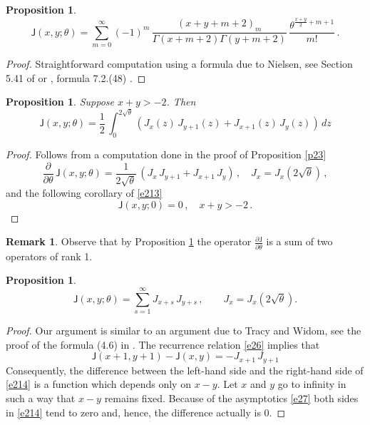 \documentclass[12pt]{amsart}
\newcommand{\Ga}{\Gamma}
\newcommand{\J}{\mathsf{J}}
\newcommand{\ix}{\theta}
\theoremstyle{plain}
\newtheorem{proposition}[lemma]{Proposition}
\theoremstyle{definition}
\newtheorem{remark}[lemma]{Remark}
\numberwithin{equation}{section}
\begin{document}
\begin{proposition}\label{p27} 
%
\begin{equation}\label{e213}
\J(x,y;\ix)=\sum_{m=0}^\infty(-1)^m\,
\frac{(x+y+m+2)_m}{\Ga(x+m+2)\Ga(y+m+2)}\,
\frac{\ix^{\frac{x+y}2+m+1}}{m!}\,.
\end{equation}
%
\end{proposition}

\begin{proof} Straightforward computation using a formula due
to Nielsen, see Section 5.41 of \cite{W} or 
\cite{HTF}, formula 7.2.(48) . \end{proof}


\begin{proposition}\label{p28} Suppose $x+y>-2$. Then 
%
\begin{equation*}
\J(x,y;\ix)=\frac12\, \int_0^{2\sqrt\ix} (J_x(z)\, J_{y+1}(z) + J_{x+1}(z)\, J_{y}(z))\, dz
\end{equation*}
%
\end{proposition}
\begin{proof} Follows from a computation done in the proof of Proposition \ref{p23}
%
\begin{equation*}
\frac{\partial}{\partial\ix} \, \J(x,y;\ix) = \frac{1}{2\sqrt{\ix}} \,
(J_x \, J_{y+1} + J_{x+1}\, J_{y}) \,,
\quad J_x=J_x(2\sqrt{\ix})\,, 
\end{equation*}
%
and the following corollary of \eqref{e213}
$$
\J(x,y;0)=0\,, \quad x+y>-2\,.
$$
\end{proof}

\begin{remark} 
Observe that  by Proposition \ref{p28} the operator $\frac{\partial\J}{\partial\ix}$
is a sum of two operators of rank 1. 
\end{remark}

\begin{proposition}\label{p29} 
%
\begin{equation}\label{e214}
\J(x,y;\ix)=\sum_{s=1}^\infty
J_{x+s}\, J_{y+s}\,, \qquad J_x=J_x(2\sqrt\ix).  
\end{equation}
%
\end{proposition}

\begin{proof} Our argument is similar to an argument due to
Tracy and Widom, see the proof of the formula (4.6)
in \cite{TW}.  The recurrence relation \eqref{e26} implies that 
%
\begin{equation}\label{e215}
\J(x+1,y+1)-\J(x,y)=-J_{x+1}\, J_{y+1}
\end{equation}
%
Consequently, the difference between the left-hand side and 
the right-hand side  of \eqref{e214} is a
function which depends only on $x-y$. Let $x$ and $y$ go to infinity 
in such a way that $x-y$ remains fixed. Because of 
the asymptotics \eqref{e27} both sides in \eqref{e214}
tend to zero and, hence, the difference actually is 0. \end{proof}
\end{document}
